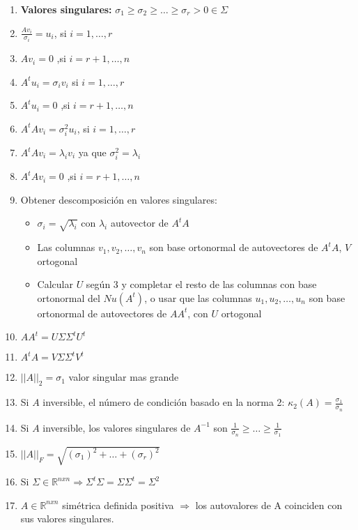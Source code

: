 \begin{enumerate}
    \item \textbf{Valores singulares: }$\sigma_1 \geq \sigma_2 \geq \dots \geq \sigma_r > 0 \in \Sigma$
    \item $\frac{Av_i}{\sigma_i} = u_i$, si $i = 1, \dots, r$
    \item $Av_i = 0$ ,si $i = r+1, \dots, n$
    \item $A^t u_i = \sigma_i v_i$ si $i = 1, \dots, r$
    \item $A^t u_i = 0 $ ,si $i = r+1, \dots, n$
    \item $A^tAv_i = \sigma_i^2 u_i$, si $i = 1, \dots, r$
    \item $A^tAv_i = \lambda_i v_i$ ya que $\sigma^2_i = \lambda_i$
    \item $A^tAv_i = 0$ ,si $i = r+1, \dots, n$
    \item Obtener descomposición en valores singulares:
    \begin{itemize}
        \item $\sigma_i = \sqrt{\lambda_i}$ con $\lambda_i$ autovector de $A^tA$ 
        \item Las columnas $v_1, v_2, \dots, v_n$ son base ortonormal de autovectores de $A^tA$, $V$ ortogonal
        \item Calcular $U$ según 3 y completar el resto de las columnas con base ortonormal del $Nu(A^t)$, o usar que las columnas $u_1, u_2, \dots, u_n$ son base ortonormal de autovectores de $AA^t$, con $U$ ortogonal
    \end{itemize}
    \item $AA^t = U \Sigma \Sigma^t U^t$
    \item $A^tA = V \Sigma \Sigma^t V^t$
    \item $||A||_2 = \sigma_1$ valor singular mas grande
    \item Si $A$ inversible, el número de condición basado en la norma 2: $\kappa_2(A) = \frac{\sigma_1}{\sigma_n}$
    \item Si $A$ inversible, los valores singulares de $A^{-1}$ son $\frac{1}{\sigma_n} \geq \dots \geq \frac{1}{\sigma_1} $
    \item $||A||_F = \sqrt{(\sigma_1)^2 + \dots + (\sigma_r)^2}$
    \item Si $\Sigma \in \mathbb{R}^{nxn} \Rightarrow \Sigma^t \Sigma = \Sigma \Sigma^t = \Sigma^2$ 
    \item $A \in \mathbb{R}^{nxn}$ simétrica definida positiva $\Rightarrow$ los autovalores de A coinciden con sus valores singulares. 
\end{enumerate}
